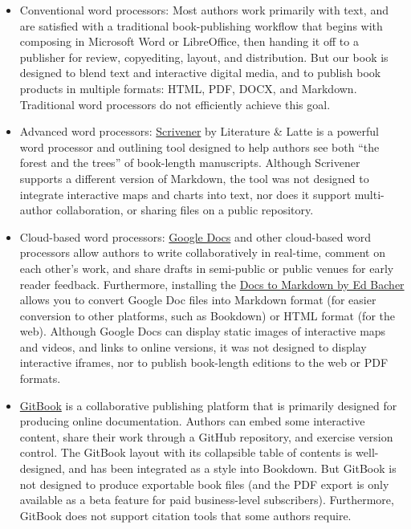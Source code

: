 \documentclass[
  english,
]{book}
\begin{document}
\begin{itemize}
\item
  Conventional word processors: Most authors work primarily with text, and are satisfied with a traditional book-publishing workflow that begins with composing in Microsoft Word or LibreOffice, then handing it off to a publisher for review, copyediting, layout, and distribution. But our book is designed to blend text and interactive digital media, and to publish book products in multiple formats: HTML, PDF, DOCX, and Markdown. Traditional word processors do not efficiently achieve this goal.
\item
  Advanced word processors: \href{https://www.literatureandlatte.com/scrivener}{Scrivener} by Literature \& Latte is a powerful word processor and outlining tool designed to help authors see both ``the forest and the trees'' of book-length manuscripts. Although Scrivener supports a different version of Markdown, the tool was not designed to integrate interactive maps and charts into text, nor does it support multi-author collaboration, or sharing files on a public repository.
\item
  Cloud-based word processors: \href{https://docs.google.com}{Google Docs} and other cloud-based word processors allow authors to write collaboratively in real-time, comment on each other's work, and share drafts in semi-public or public venues for early reader feedback. Furthermore, installing the \href{https://github.com/evbacher/gd2md-html/wiki}{Docs to Markdown by Ed Bacher} allows you to convert Google Doc files into Markdown format (for easier conversion to other platforms, such as Bookdown) or HTML format (for the web). Although Google Docs can display static images of interactive maps and videos, and links to online versions, it was not designed to display interactive iframes, nor to publish book-length editions to the web or PDF formats.
\item
  \href{https://www.gitbook.com}{GitBook} is a collaborative publishing platform that is primarily designed for producing online documentation. Authors can embed some interactive content, share their work through a GitHub repository, and exercise version control. The GitBook layout with its collapsible table of contents is well-designed, and has been integrated as a style into Bookdown. But GitBook is not designed to produce exportable book files (and the PDF export is only available as a beta feature for paid business-level subscribers). Furthermore, GitBook does not support citation tools that some authors require.

\end{itemize}
\end{document}
